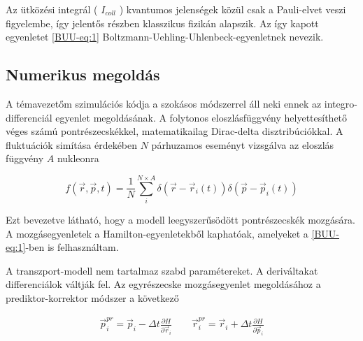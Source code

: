 \documentclass[a4paper,12pt]{article}
\begin{document}
\vspace{5mm}

\par Az ütközési integrál ( $I_{coll}$ ) kvantumos jelenségek közül csak a Pauli-elvet veszi figyelembe, így jelentős részben klasszikus fizikán alapszik. Az így kapott egyenletet \eqref{BUU-eq:1} Boltzmann-Uehling-Uhlenbeck-egyenletnek nevezik.

\vspace{5mm}

\subsection{ Numerikus megoldás}

\par A témavezetőm szimulációs kódja a szokásos módszerrel áll neki ennek az integro-differenciál egyenlet megoldásának. A folytonos eloszlásfüggvény helyettesíthető véges számú pontrészecskékkel, matematikailag Dirac-delta disztribúciókkal. A fluktuációk simítása érdekében $N$ párhuzamos eseményt vizsgálva az eloszlás függvény $A$ nukleonra

\vspace{5mm}

\begin{equation}
	f(\vec{r}, \vec{p}, t) = \frac{1}{N}\sum_{i}^{N \times A} \delta(\vec{r} - \vec{r}_{i}(t))\delta(\vec{p} - \vec{p}_{i}(t))
\end{equation}

\vspace{5mm}

\par Ezt bevezetve látható, hogy a modell leegyszerűsödött pontrészecskék mozgására. A mozgásegyenletek a Hamilton-egyenletekből kaphatóak, amelyeket a \eqref{BUU-eq:1}-ben is felhasználtam.

\vspace{5mm}

\par A transzport-modell nem tartalmaz szabd paramétereket. A deriváltakat differenciálok váltják fel. Az egyrészecske mozgásegyenlet megoldásához a prediktor-korrektor módszer a következő

\vspace{5mm}

\begin{gather}
	\vec{p}^{pr}_{i} = \vec{p}_{i} - \Delta t \frac{\partial H}{\partial \vec{r}_{i}} \quad \quad \vec{r}^{pr}_{i} = \vec{r}_{i} + \Delta t \frac{\partial H}{\partial \vec{p}_{i}}
\end{gather}
\end{document}
